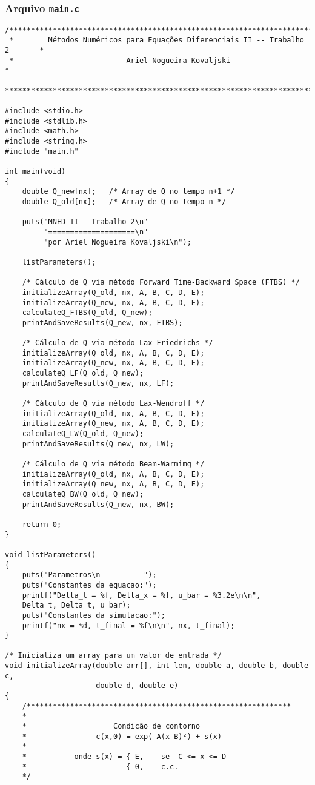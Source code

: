 \subsubsection{Arquivo \texttt{main.c}}
\begin{Verbatim}[fontsize=\footnotesize]
/******************************************************************************
 *        Métodos Numéricos para Equações Diferenciais II -- Trabalho 2       *
 *                          Ariel Nogueira Kovaljski                          *
 ******************************************************************************/

#include <stdio.h>
#include <stdlib.h>
#include <math.h>
#include <string.h>
#include "main.h"

int main(void)
{
    double Q_new[nx];   /* Array de Q no tempo n+1 */
    double Q_old[nx];   /* Array de Q no tempo n */

    puts("MNED II - Trabalho 2\n"
         "====================\n"
         "por Ariel Nogueira Kovaljski\n");

    listParameters();

    /* Cálculo de Q via método Forward Time-Backward Space (FTBS) */
    initializeArray(Q_old, nx, A, B, C, D, E);
    initializeArray(Q_new, nx, A, B, C, D, E);
    calculateQ_FTBS(Q_old, Q_new);
    printAndSaveResults(Q_new, nx, FTBS);

    /* Cálculo de Q via método Lax-Friedrichs */
    initializeArray(Q_old, nx, A, B, C, D, E);
    initializeArray(Q_new, nx, A, B, C, D, E);
    calculateQ_LF(Q_old, Q_new);
    printAndSaveResults(Q_new, nx, LF);

    /* Cálculo de Q via método Lax-Wendroff */
    initializeArray(Q_old, nx, A, B, C, D, E);
    initializeArray(Q_new, nx, A, B, C, D, E);
    calculateQ_LW(Q_old, Q_new);
    printAndSaveResults(Q_new, nx, LW);

    /* Cálculo de Q via método Beam-Warmimg */
    initializeArray(Q_old, nx, A, B, C, D, E);
    initializeArray(Q_new, nx, A, B, C, D, E);
    calculateQ_BW(Q_old, Q_new);
    printAndSaveResults(Q_new, nx, BW);

    return 0;
}

void listParameters()
{
    puts("Parametros\n----------");
    puts("Constantes da equacao:");
    printf("Delta_t = %f, Delta_x = %f, u_bar = %3.2e\n\n",
    Delta_t, Delta_t, u_bar);
    puts("Constantes da simulacao:");
    printf("nx = %d, t_final = %f\n\n", nx, t_final);
}

/* Inicializa um array para um valor de entrada */
void initializeArray(double arr[], int len, double a, double b, double c,
                     double d, double e)
{
    /*************************************************************
    *
    *                    Condição de contorno
    *                c(x,0) = exp(-A(x-B)²) + s(x)
    *
    *           onde s(x) = { E,    se  C <= x <= D
    *                       { 0,    c.c.
    */


\end{Verbatim}
